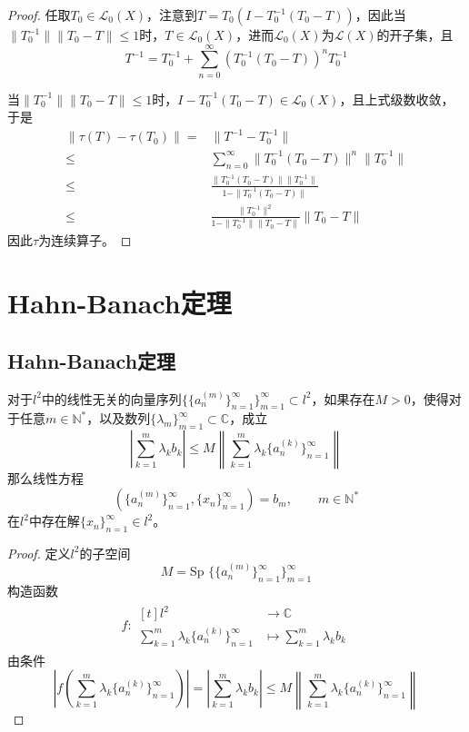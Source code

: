 \documentclass[lang = cn, scheme = chinese, thmcnt = section]{elegantbook}
\newcommand{\N}{\mathbb{N}}            %
\newcommand{\C}{\mathbb{C}}  		   %
\newcommand{\sub}{\subset}             %
\begin{document}
\begin{proof}
	任取$T_0\in \mathcal{L}_0(X)$，注意到$T=T_0(I-T_0^{-1}(T_0-T))$，因此当$\|T_0^{-1}\|\|T_0-T\|\le1$时，$T\in \mathcal{L}_0(X)$，进而$\mathcal{L}_0(X)$为$\mathcal{L}(X)$的开子集，且
	$$
	T^{-1}=T_0^{-1}+\sum_{n=0}^{\infty}(T_0^{-1}(T_0-T))^nT_0^{-1}
	$$
	
	当$\|T_0^{-1}\|\|T_0-T\|\le1$时，$I-T_0^{-1}(T_0-T)\in\mathcal{L}_0(X)$，且上式级数收敛，于是
	\begin{align*}
		\|\tau(T)-\tau(T_0)\|=&\|T^{-1}-T_0^{-1}\|\\
		\le & \sum_{n=0}^{\infty}\|T_0^{-1}(T_0-T)\|^n\|T_0^{-1}\|\\
		\le & \frac{\|T_0^{-1}(T_0-T)\|\|T_0^{-1}\|}{1-\|T_0^{-1}(T_0-T)\|}\\
		\le & \frac{\|T_0^{-1}\|^2}{1-\|T_0^{-1}\|\|T_0-T\|}\|T_0-T\|
	\end{align*}
	因此$\tau$为连续算子。
\end{proof}

\section{Hahn-Banach定理}

\subsection{Hahn-Banach定理}

\begin{proposition}
	对于$l^2$中的线性无关的向量序列$\{ \{ a_n^{(m)} \}_{n=1}^{\infty} \}_{m=1}^{\infty}\sub l^2$，如果存在$M>0$，使得对于任意$m\in\N^*$，以及数列$\{\lambda_m\}_{m=1}^{\infty}\sub\C$，成立
	$$
	\left| \sum_{k=1}^{m}\lambda_k b_k \right|
	\le M\left\| \sum_{k=1}^{m}\lambda_k \{a_n^{(k)}\}_{n=1}^{\infty} \right\|
	$$
	那么线性方程
	$$
	\left(\{a_n^{(m)}\}_{n=1}^{\infty},\{x_n\}_{n=1}^{\infty}\right)=b_m,\qquad m\in\N^*
	$$
	在$l^2$中存在解$\{x_n\}_{n=1}^{\infty}\in l^2$。
\end{proposition}

\begin{proof}
	定义$l^2$的子空间
	$$
	M=\text{Sp }\{ \{ a_n^{(m)} \}_{n=1}^{\infty} \}_{m=1}^{\infty}
	$$
	构造函数
	\begin{align*}
		f:\begin{aligned}[t]
			l^2&\longrightarrow \C\\
			\sum_{k=1}^{m}\lambda_k\{a_n^{(k)}\}_{n=1}^{\infty}&\longmapsto \sum_{k=1}^{m}\lambda_k b_k
		\end{aligned}
	\end{align*}
	由条件
	$$
	\left| f\left(\sum_{k=1}^{m}\lambda_k\{a_n^{(k)}\}_{n=1}^{\infty}\right) \right|=
	\left| \sum_{k=1}^{m}\lambda_k b_k \right|
	\le M\left\| \sum_{k=1}^{m}\lambda_k \{a_n^{(k)}\}_{n=1}^{\infty} \right\|
	$$
\end{proof}
\end{document}

